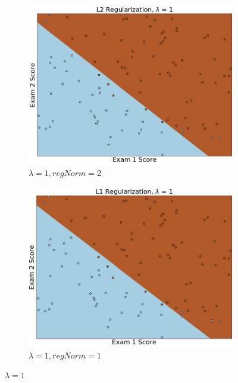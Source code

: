 \documentclass{article}
\begin{document}
\begin{enumerate}
    	\begin{figure}[h!]
     	\centering
     	\begin{subfigure}[b]{0.44\textwidth}
         	\centering
         	\includegraphics[width=\textwidth]
         	{Problem_1_3/fig_L2_4.png}
         	\caption{$\lambda = 1, regNorm = 2$}
         	\label{fig:L2_4}
     	\end{subfigure}
     	\hfill
     	\begin{subfigure}[b]{0.44\textwidth}
         	\centering
         	\includegraphics[width=\textwidth]
         	{Problem_1_3/fig_L1_4.png}
         	\caption{$\lambda = 1, regNorm = 1$}
         	\label{fig:L1_4}
     	\end{subfigure}
     	\caption{$\lambda=1$}
		\end{figure}
		

\end{enumerate}
\end{document}
